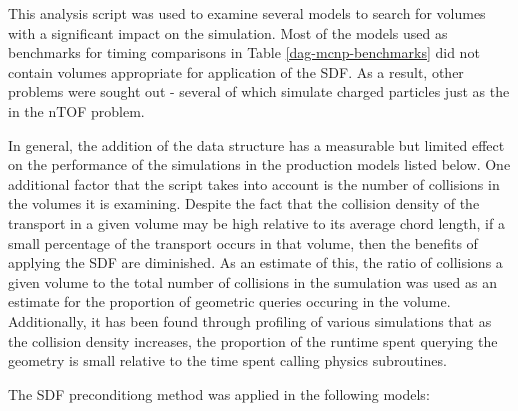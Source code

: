 This analysis script was used to examine several models to search for volumes
with a significant impact on the simulation. Most of the models used as
benchmarks for timing comparisons in Table \ref{dag-mcnp-benchmarks} did not
contain volumes appropriate for application of the SDF. As a result, other
problems were sought out - several of which simulate charged particles just as
the in the nTOF problem.

In general, the addition of the data structure has a measurable but limited
effect on the performance of the simulations in the production models listed
below. One additional factor that the script takes into account is the number of
collisions in the volumes it is examining. Despite the fact that the collision
density of the transport in a given volume may be high relative to its average
chord length, if a small percentage of the transport occurs in that volume, then
the benefits of applying the SDF are diminished. As an estimate of this, the
ratio of collisions a given volume to the total number of collisions in the
sumulation was used as an estimate for the proportion of geometric queries
occuring in the volume.  Additionally, it has been found through profiling of
various simulations that as the collision density increases, the proportion of the
runtime spent querying the geometry is small relative to the time spent calling
physics subroutines.

The SDF preconditiong method was applied in the following models:





